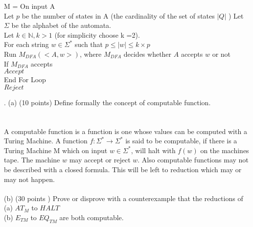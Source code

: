 \documentclass{report}
\newcommand{\me}[1]{
\begin{math}
#1
\end{math}
}
\begin{document}
 M = On input A \\
  Let $p$ be the number of states in A (the cardinality of the set of states \me{|Q|})
  Let $\Sigma$ be the alphabet of the automata. \\
  Let $k \in \mathbb{N}, k>1$ (for simplicity choose k =2).\\
  For each string \me{w \in \Sigma^*} such that \me{p \leq |w| \leq k\times p}\\
  \indent Run $M_{DFA}(<A,w>)$, where $M_{DFA}$ decides whether $A$ accepts $w$ or not \\
  \indent If $M_{DFA}$ accepts\\ 
  \indent \indent $Accept$ \\
  End For Loop \\
  $Reject$



. (a) (10 points) Define formally the concept of computable function. \\\\
\\
A computable function is a function is one whose values can be computed with a Turing Machine.
A function \me{f:\Sigma^* \to \Sigma^*} is said to be computable, if there is a Turing Machine M which on input $w \in \Sigma^*$, will halt with $f(w)$ on the machines tape. The machine $w$ may accept or reject $w$. Also computable functions may not be described with a closed formula. This will be left to reduction which may or may not happen. \\ \\
(b) (30 points ) Prove or disprove with a counterexample that the reductions of \\
\indent (a) $ AT_M$ to $HALT $\\
\indent (b) $ E_{TM}$ to $EQ_{TM} $ are both computable.

\end{document}
